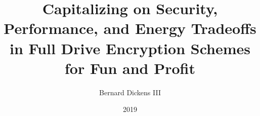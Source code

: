 \documentclass{ucetd}
\title{Capitalizing on Security, Performance, and Energy Tradeoffs in Full Drive Encryption Schemes for Fun and Profit}
\author{Bernard Dickens III}
\date{2019}
\begin{document}
\maketitle


\tableofcontents
\listoftables


\abstract


\mainmatter






%
%

\clearpage
\printbibliography
\end{document}
